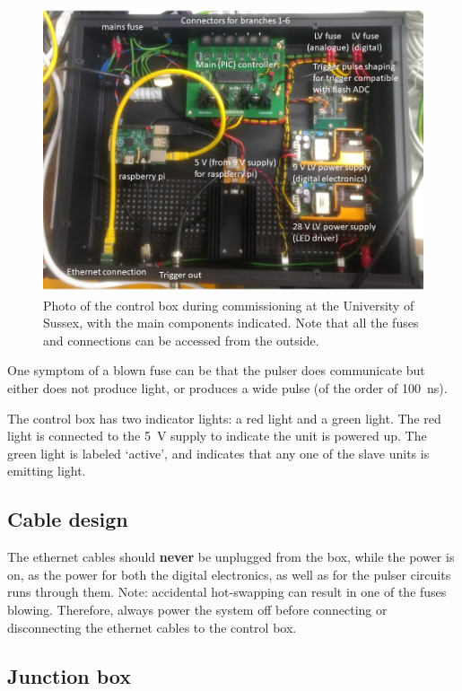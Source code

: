 \begin{figure}
\begin{center}	
  \includegraphics[width=0.75\linewidth]{figures/controlbox.jpg}
  \caption{Photo of the control box during commissioning at the University of Sussex, with the main components indicated. Note that all the fuses and connections can be accessed from the outside.}
  \label{figure:controlbox}
\end{center}
\end{figure}

One symptom of a blown fuse can be that  the pulser does communicate but either does not produce light, or produces a wide pulse (of the order of 100~ns).

The control box has two indicator lights: a red light and a green light.
The red light is connected to the 5~V supply to indicate the unit is powered up. 
The green light is labeled ‘active’, and indicates that any one of the slave units is emitting light.


\subsection*{Cable design}

The ethernet cables should {\bf never} be unplugged from the box, while the power is on, as the power for both the digital electronics, as well as for the pulser circuits runs through them. Note: accidental hot-swapping can result in one of the fuses blowing. Therefore, always power the system off before connecting or disconnecting the ethernet cables to the control box.

\subsection*{Junction box}

